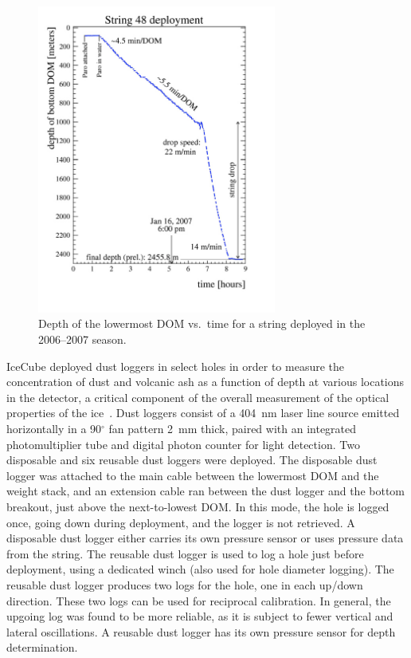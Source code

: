 \begin{figure}[!ht]
 \centering
 \includegraphics[width=0.70\textwidth]{graphics/drill/String48_profile.pdf}
\caption{Depth of the lowermost DOM vs.~time for a string deployed in the
  2006--2007 season.}
\label{fig:deploytime}
\end{figure}

IceCube deployed dust loggers in select holes in order to measure the
concentration of dust and volcanic ash as a function of depth at various
locations in the detector, a critical component of the overall measurement
of the optical properties of the
ice~\cite{Aartsen:2013rt,citeulike:2998650}. Dust loggers 
consist of a 404~nm laser line source emitted horizontally in a
90$^{\circ}$ fan pattern 2~mm thick, paired with an integrated
photomultiplier tube and digital photon counter for light detection. Two
disposable and six reusable dust loggers were deployed. The disposable dust
logger was attached to the main cable between the lowermost DOM and the
weight stack, and an extension cable ran between the dust logger and the
bottom breakout, just above the next-to-lowest DOM. In this mode, the hole
is logged once, going down during deployment, and the logger is not
retrieved. A disposable dust logger either carries its own pressure sensor
or uses pressure data from the string. The reusable dust logger is used to
log a hole just before deployment, using a dedicated winch (also used for
hole diameter logging). The reusable dust logger produces two logs for the
hole, one in each up/down direction. These two logs can be used for
reciprocal calibration. In general, the upgoing log was found to be more reliable,
as it is subject to fewer vertical and lateral oscillations. A reusable
dust logger has its own pressure sensor for depth determination.

